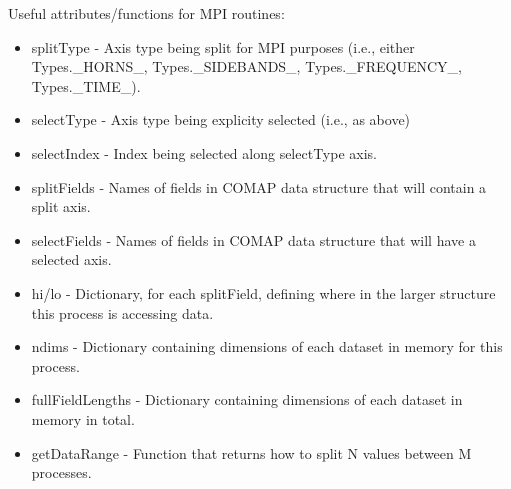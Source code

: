 \documentclass[11pt]{article}
\begin{document}
Useful attributes/functions for MPI routines:
\begin{itemize}
\item splitType - Axis type being split for MPI purposes (i.e., either Types.\_HORNS\_, Types.\_SIDEBANDS\_, Types.\_FREQUENCY\_, Types.\_TIME\_).
\item selectType - Axis type being explicity selected (i.e., as above)
\item selectIndex - Index being selected along selectType axis.
\item splitFields - Names of fields in COMAP data structure that will contain a split axis.
\item selectFields - Names of fields in COMAP data structure that will have a selected axis.
\item hi/lo - Dictionary, for each splitField, defining where in the larger structure this process is accessing data.
\item ndims - Dictionary containing dimensions of each dataset in memory for this process.
\item fullFieldLengths - Dictionary containing dimensions of each dataset in memory in total.
\item getDataRange - Function that returns how to split N values between M processes.
\end{itemize}
\end{document}
